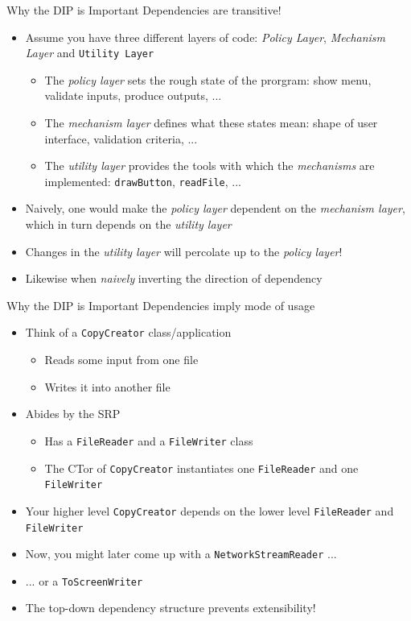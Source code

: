 \begin{frame}{Why the DIP is Important}
%
Dependencies are transitive!
\begin{itemize}
\item Assume you have three different layers of code: \emph{Policy Layer}, \emph{Mechanism Layer} and \texttt{Utility Layer}
	\begin{itemize}
	\item The \emph{policy layer} sets the rough state of the prorgram: show menu, validate inputs, produce outputs, ...
	\item The \emph{mechanism layer} defines what these states mean: shape of user interface, validation criteria, ...
	\item The \emph{utility layer} provides the tools with which the \emph{mechanisms} are implemented: \texttt{drawButton}, \texttt{readFile}, ...
	\end{itemize}
\pause
\item Naively, one would make the \emph{policy layer} dependent on the \emph{mechanism layer}, which in turn depends on the \emph{utility layer}
\item[\Thus] Changes in the \emph{utility layer} will percolate up to the \emph{policy layer}!
\item[\Thus] Likewise when \emph{naively} inverting the direction of dependency
\end{itemize}
%
\end{frame}


\begin{frame}{Why the DIP is Important}
%
Dependencies imply mode of usage
\begin{itemize}
\item Think of a \texttt{CopyCreator} class/application
	\begin{itemize}
	\item Reads some input from one file
	\item Writes it into another file
	\end{itemize}
\pause
\item Abides by the SRP
	\begin{itemize}
	\item Has a \texttt{FileReader} and a \texttt{FileWriter} class
	\item[\Thus] The CTor of \texttt{CopyCreator} instantiates one \texttt{FileReader} and one \texttt{FileWriter}
	\end{itemize}
\item[\Thus] Your higher level \texttt{CopyCreator} depends on the lower level \texttt{FileReader} and \texttt{FileWriter}
\pause
\item Now, you might later come up with a \texttt{NetworkStreamReader} ...
\item ... or a \texttt{ToScreenWriter}
\item[\Thus] The top-down dependency structure prevents extensibility!
\end{itemize}
%
\end{frame}

